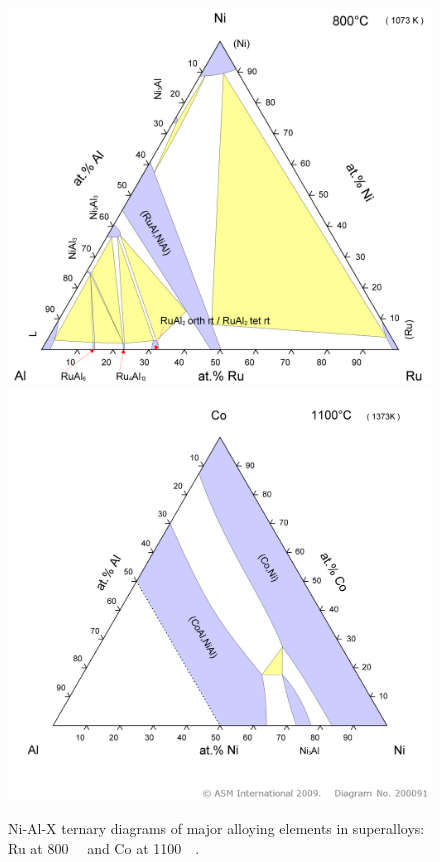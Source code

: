 \begin{figure}[H]
\begin{center}
\includegraphics[width=12cm]{NiAlRu}
\includegraphics[width=12cm]{NiAlCo1100}
\caption{Ni-Al-X ternary diagrams of major alloying elements in superalloys: Ru at 800\celsius\ ~\cite{sokolovskaya85} and Co at 1100\celsius\ ~\cite{kainuma96}.}
\label{fig:SLii}
\end{center}
\end{figure}

